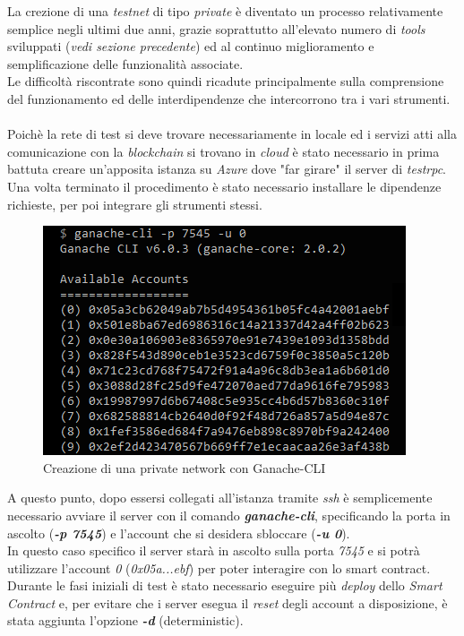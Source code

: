 \documentclass[11pt]{thesistemp}
\begin{document}
La crezione di una \textit{testnet} di tipo \textit{private} è diventato un processo relativamente semplice negli ultimi due anni, grazie soprattutto all'elevato numero di \textit{tools} sviluppati (\textit{vedi sezione precedente}) ed al continuo miglioramento e semplificazione delle funzionalità associate.\\
Le difficoltà riscontrate sono quindi ricadute principalmente sulla comprensione del funzionamento ed delle interdipendenze che intercorrono tra i vari strumenti.\\\\
Poichè la rete di test si deve trovare necessariamente in locale ed i servizi atti alla comunicazione con la \textit{blockchain} si trovano in \textit{cloud} è stato necessario in prima battuta creare un'apposita istanza su \textit{Azure} dove "far girare" il server di \textit{testrpc}.\\
Una volta terminato il procedimento è stato necessario installare le dipendenze richieste, per poi integrare gli strumenti stessi.\\
\begin{figure}[h]
    \centering
    \includegraphics[scale=0.7]{ganache-cli.png}
        \caption{Creazione di una private network con Ganache-CLI}
    \label{fig:ganache-cli}
\end{figure}
\linebreak
A questo punto, dopo essersi collegati all'istanza tramite \textit{ssh} è semplicemente necessario avviare il server con il comando \textbf{\textit{ganache-cli}}, specificando la porta in ascolto (\textbf{\textit{-p 7545}}) e l'account che si desidera sbloccare (\textbf{\textit{-u 0}}).\\
In questo caso specifico il server starà in ascolto sulla porta \textit{7545} e si potrà utilizzare l'account \textit{0} (\textit{0x05a...ebf}) per poter interagire con lo smart contract.\\
Durante le fasi iniziali di test è stato necessario eseguire più \textit{deploy} dello \textit{Smart Contract} e, per evitare che i server esegua il \textit{reset} degli account a disposizione, è stata aggiunta l'opzione \textbf{\textit{-d}} (deterministic).
\end{document}
